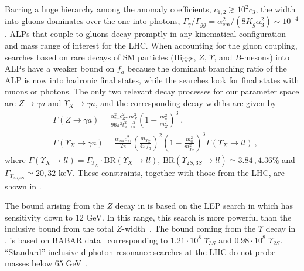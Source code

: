 Barring a huge hierarchy among the anomaly coefficients, $c_{1,2} \gtrsim 10^2 c_3$, the width into gluons dominates over the one into photons, $\Gamma_{\gamma}/\Gamma_{gg}=\alpha_{\text{em}}^2/(8K_g\alpha_3^2) \sim 10^{-4}$.
ALPs that couple to gluons decay promptly in any kinematical configuration and mass range of interest for the LHC.
When accounting for the gluon coupling, searches based on rare decays of SM particles (Higgs, $Z$, $\Upsilon$, and $B$-mesons) into ALPs have a weaker bound on $f_a$ because the dominant branching ratio of the ALP is now into hadronic final states,
while the searches look for final states with muons or photons.
The only two relevant decay processes for our parameter space are $Z\to\gamma a$ and $\Upsilon_X\to \gamma a$, and the corresponding decay widths are given by
%
\begin{align}
&\Gamma(Z\to\gamma a)= \frac{\alpha_{\text{em}}^2c_{Z\gamma}^2}{96\pi^2t_w^2}\frac{m_Z^3}{f_a^2}\left(1-\frac{m_a^2}{m_Z^2}\right)^3 \ , \label{eq:Z}\\
&\Gamma(\Upsilon_X\to \gamma a)= \frac{\alpha_{\text{em}}c_{\gamma\gamma}^2}{2\pi}\left(\frac{m_{\Upsilon_X}}{4\pi f_a}\right)^2\left(1-\frac{m_a^2}{m_{\Upsilon_X}^2}\right)^3\Gamma(\Upsilon_X\to ll)\ ,\label{eq:upsilon}
\end{align}
%
where $\Gamma(\Upsilon_X\to ll)=\Gamma_{\Upsilon_X}\cdot \text{BR} (\Upsilon_X\to ll)$, $\text{BR} (\Upsilon_{2S,3S}\to ll)\simeq3.84\,,4.36\%$ and $\Gamma_{\Upsilon_{2S,3S}}\simeq20,32\text{ keV}$.
These constraints, together with those from the LHC, are shown in .


The bound arising from the $Z$ decay in  is based on the LEP search in  which has sensitivity down to 12 GeV.  In this range, this search is more powerful than the inclusive bound from the total $Z$-width~\cite{Patrignani:2016xqp}.  The bound coming from the $\Upsilon$ decay in , is based on BABAR data~\cite{Lees:2011wb} corresponding to $1.21\cdot 10^8$ $\Upsilon_{3S}$ and $0.98\cdot 10^8$  $\Upsilon_{2S}$.
``Standard'' inclusive diphoton resonance searches at the LHC do not probe masses below 65 GeV~\cite{Aad:2014ioa,CMS:2015ocq,CMS:2017yta}.

